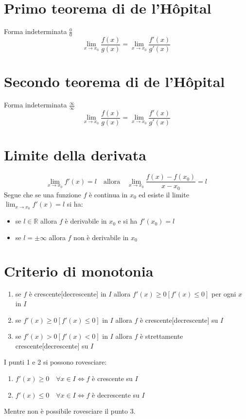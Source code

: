 \documentclass[12pt, a4paper]{report}
\begin{document}
    \section{Primo teorema di de l'Hôpital}
    Forma indeterminata $\frac{0}{0}$
    \begin{equation*}
        \lim_{x\to x_{0}}\frac{f(x)}{g(x)}=\lim_{x\to x_{0}}\frac{f'(x)}{g'(x)}
    \end{equation*}
    \section{Secondo teorema di de l'Hôpital}
    Forma indeterminata $\frac{\infty}{\infty}$
    \begin{equation*}
        \lim_{x\to x_{0}}\frac{f(x)}{g(x)}=\lim_{x\to x_{0}}\frac{f'(x)}{g'(x)}
    \end{equation*}
    \section{Limite della derivata}
    \begin{equation*}
        \lim_{x\to x_{0}} f'(x)=l \quad \text{allora} \quad \lim_{x\to x_{0}}\frac{f(x)-f(x_{0})}{x-x_{0}}=l
    \end{equation*}
    Segue che se una funzione $f$ è continua in $x_{0}$ ed esiste il limite $\lim_{x\to x_{0}}f'(x)=l$ si ha:
    \begin{itemize}
        \item se $l\in \mathbb{R}$ allora $f$ è derivabile in $x_{0}$ e si ha $f'(x_{0})=l$
        \item se $l=\pm\infty$ allora $f$ non è derivabile in $x_{0}$
    \end{itemize}
    \section{Criterio di monotonia}
    \begin{enumerate}
        \item se $f$ è crescente[decrescente] in $I$ allora $f'(x)\geq 0[f'(x)\leq 0]$ per ogni $x$ in $I$
        \item se $f'(x)\geq 0[f'(x)\leq 0]$ in $I$ allora $f$ è crescente[decrescente] su $I$
        \item se $f'(x)>0[f'(x)<0]$ in $I$ allora $f$ è strettamente crescente[decrescente] su $I$
    \end{enumerate}
    I punti 1 e 2 si possono rovesciare:
    \begin{enumerate}
        \item $f'(x)\geq 0\quad \forall x \in I \iff f$ è crescente su $I$
        \item $f'(x)\leq 0\quad \forall x \in I \iff f$ è decrescente su $I$
    \end{enumerate}
    Mentre non è possibile rovesciare il punto 3.
\end{document}
